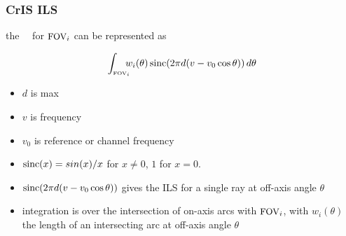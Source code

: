 \documentclass[11pt]{beamer}
\begin{document}
\begin{frame}
\frametitle{CrIS ILS}

the \cris\ \ils\ for $\mbox{\small FOV}_i$ can be represented as

\[\int_{\mbox{\tiny FOV}_i} \!\!\!\! w_i(\theta)\, \mbox{sinc}(2 \pi
                 d(v - v_0 \cos \theta ))\, d\theta \]


\begin{itemize}
  \item $d$ is max \opd
  \item $v$ is frequency
  \item $v_0$ is reference or channel frequency
  \item $\mbox{sinc}(x) = sin(x)/x$ for $x \ne 0$,  $1$ for $x = 0$.
  \item $\mbox{sinc}(2 \pi d(v - v_0 \cos \theta ))$ gives the ILS for a
    single ray at off-axis angle $\theta$
  \item integration is over the intersection of on-axis arcs with
    $\mbox{\small FOV}_i$, with $w_i(\theta)$ the length of an intersecting arc
    at off-axis angle $\theta$
\end{itemize}

\end{frame}
\end{document}
